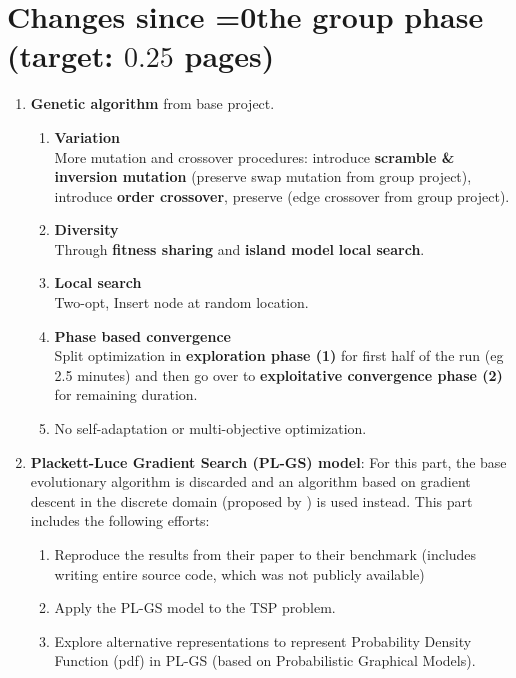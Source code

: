 \documentclass[a4paper,10pt]{article}
\def\retake{0}
\newcommand{\switch}[2]{\ifnum\retake=0{#1}\else{#2}\fi}
\newcommand{\ReplaceMe}[1]{{\color{blue}#1}}
\begin{document}
\section{Changes since \switch{the group phase}{your previous submission} (target: $0.25$ pages)}

\begin{enumerate}
	\item \textbf{Genetic algorithm} from base project.
	\begin{enumerate}
	\item \textbf{Variation} \\
			More mutation and crossover procedures: introduce \textbf{scramble \& inversion mutation} (preserve swap mutation from group project), introduce \textbf{order crossover}, preserve (edge crossover from group project).
				
	\item \textbf{Diversity} \\
			Through \textbf{fitness sharing} and \textbf{island model} \textbf{local search}.

	\item \textbf{Local search} \\
			Two-opt, Insert node at random location.
	
	\item \textbf{Phase based convergence} \\
		Split optimization in \textbf{exploration phase (1)} for first half of the run (eg 2.5 minutes) and then go over to \textbf{exploitative convergence phase (2)} for remaining duration.
		
	\item No self-adaptation or multi-objective optimization.
	\end{enumerate}
	
	\item \textbf{Plackett-Luce Gradient Search (PL-GS) model}: For this part, the base evolutionary algorithm is discarded and an algorithm based on gradient descent in the discrete domain (proposed by \citep{ceberiojosu_model-based_2023, santucci_gradient_2020}) is used instead. This part includes the following efforts:
		\begin{enumerate}
			\item Reproduce the results from their paper to their benchmark (includes writing entire source code, which was not publicly available)
			\item Apply the PL-GS model to the TSP problem.
			\item Explore alternative representations to represent Probability Density Function (pdf) in PL-GS (based on Probabilistic Graphical Models).
		\end{enumerate}
	
\end{enumerate}
\end{document}
